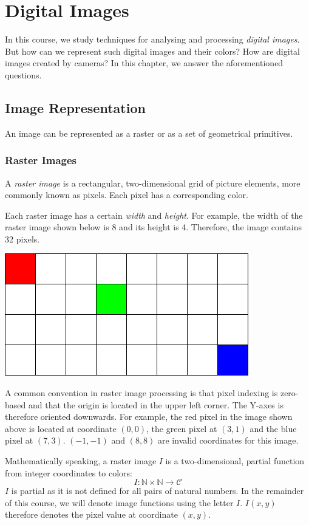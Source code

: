 \documentclass{book}
\begin{document}
\chapter{Digital Images}
In this course, we study techniques for analysing and processing \emph{digital images}. But how can we represent such digital images and their colors? How are digital images created by cameras? In this chapter, we answer the aforementioned questions.

\section{Image Representation}
An image can be represented as a raster or as a set of geometrical primitives.

\subsection{Raster Images}
A \emph{raster image} is a rectangular, two-dimensional grid of picture elements, more commonly known as pixels. Each pixel has a corresponding color.

Each raster image has a certain \emph{width} and \emph{height}. For example, the width of the raster image shown below is 8 and its height is 4. Therefore, the image contains 32 pixels.
\begin{center}
\includegraphics[scale=0.35]{rasterimage.png}
\end{center}
A common convention in raster image processing is that pixel indexing is zero-based and that the origin is located in the upper left corner. The Y-axes is therefore oriented downwards. For example, the red pixel in the image shown above is located at coordinate $(0, 0)$, the green pixel at $(3, 1)$ and the blue pixel at $(7, 3)$. $(-1, -1)$ and $(8, 8)$ are invalid coordinates for this image.

Mathematically speaking, a raster image $I$ is a two-dimensional, partial function from integer coordinates to colors:
$$I: \mathbb{N} \times \mathbb{N} \rightarrow \mathcal{C}$$
$I$ is partial as it is not defined for all pairs of natural numbers. In the remainder of this course, we will denote image functions using the letter $I$. $I(x, y)$ therefore denotes the pixel value at coordinate $(x, y)$.
\end{document}
